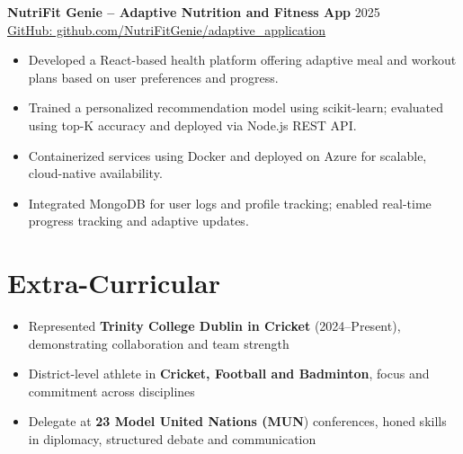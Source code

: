 \documentclass[a4paper,9pt]{article}
\begin{document}
\textbf{NutriFit Genie – Adaptive Nutrition and Fitness App }
\hfill 2025
\\ {\href{https://github.com/NutriFitGenie/adaptive_application}{GitHub: github.com/NutriFitGenie/adaptive\_application}} 
\begin{itemize}[leftmargin=*]
  \item Developed a React-based health platform offering adaptive meal and workout plans based on user preferences and progress.
  \item Trained a personalized recommendation model using scikit-learn; evaluated using top-K accuracy and deployed via Node.js REST API.
  \item Containerized services using Docker and deployed on Azure for scalable, cloud-native availability.
  \item Integrated MongoDB for user logs and profile tracking; enabled real-time progress tracking and adaptive updates.
\end{itemize}






\section*{Extra-Curricular}
\begin{itemize}[leftmargin=*]
    \item Represented \textbf{Trinity College Dublin in Cricket} (2024–Present), demonstrating collaboration and team strength
    \item District-level athlete in 
    \textbf{Cricket, Football and Badminton}, focus and commitment across disciplines
    \item Delegate at \textbf{23 Model United Nations (MUN}) conferences, honed skills in diplomacy, structured debate and communication

\end{itemize}
\end{document}
